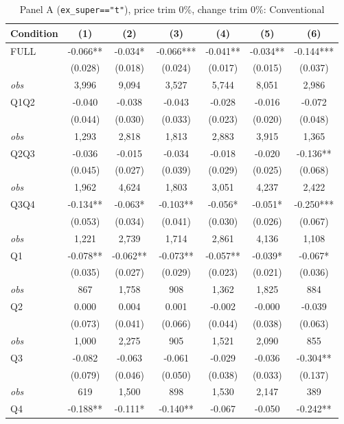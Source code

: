 \documentclass[11pt]{article}
\begin{document}
\begin{table}[!htbp]
\centering
\caption{Panel A (\texttt{ex\_super=="t"}), price trim 0\%, change trim 0\%: Conventional}
\label{tab:a:trim00:conventional}
\small
\begin{tabular}{lcccccc}
\toprule
Condition & (1) & (2) & (3) & (4) & (5) & (6) \\
\midrule
FULL & -0.066** & -0.034* & -0.066*** & -0.041** & -0.034** & -0.144*** \\
 & (0.028) & (0.018) & (0.024) & (0.017) & (0.015) & (0.037) \\
\textit{obs} & 3,996 & 9,094 & 3,527 & 5,744 & 8,051 & 2,986 \\
Q1Q2 & -0.040 & -0.038 & -0.043 & -0.028 & -0.016 & -0.072 \\
 & (0.044) & (0.030) & (0.033) & (0.023) & (0.020) & (0.048) \\
\textit{obs} & 1,293 & 2,818 & 1,813 & 2,883 & 3,915 & 1,365 \\
Q2Q3 & -0.036 & -0.015 & -0.034 & -0.018 & -0.020 & -0.136** \\
 & (0.045) & (0.027) & (0.039) & (0.029) & (0.025) & (0.068) \\
\textit{obs} & 1,962 & 4,624 & 1,803 & 3,051 & 4,237 & 2,422 \\
Q3Q4 & -0.134** & -0.063* & -0.103** & -0.056* & -0.051* & -0.250*** \\
 & (0.053) & (0.034) & (0.041) & (0.030) & (0.026) & (0.067) \\
\textit{obs} & 1,221 & 2,739 & 1,714 & 2,861 & 4,136 & 1,108 \\
Q1 & -0.078** & -0.062** & -0.073** & -0.057** & -0.039* & -0.067* \\
 & (0.035) & (0.027) & (0.029) & (0.023) & (0.021) & (0.036) \\
\textit{obs} &   867 & 1,758 &   908 & 1,362 & 1,825 &   884 \\
Q2 & 0.000 & 0.004 & 0.001 & -0.002 & -0.000 & -0.039 \\
 & (0.073) & (0.041) & (0.066) & (0.044) & (0.038) & (0.063) \\
\textit{obs} & 1,000 & 2,275 &   905 & 1,521 & 2,090 &   855 \\
Q3 & -0.082 & -0.063 & -0.061 & -0.029 & -0.036 & -0.304** \\
 & (0.079) & (0.046) & (0.050) & (0.038) & (0.033) & (0.137) \\
\textit{obs} &   619 & 1,500 &   898 & 1,530 & 2,147 &   389 \\
Q4 & -0.188** & -0.111* & -0.140** & -0.067 & -0.050 & -0.242** \\

\end{tabular}
\end{table}
\end{document}
